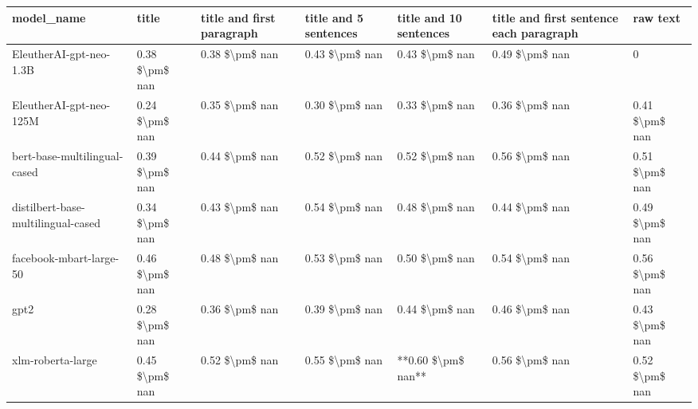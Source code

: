 \begin{tabular}{lllllll}
\toprule
                        model\_name &          title & title and first paragraph & title and 5 sentences & title and 10 sentences & title and first sentence each paragraph &       raw text \\
\midrule
           EleutherAI-gpt-neo-1.3B & 0.38 \$\textbackslash pm\$ nan &            0.38 \$\textbackslash pm\$ nan &        0.43 \$\textbackslash pm\$ nan &         0.43 \$\textbackslash pm\$ nan &                          0.49 \$\textbackslash pm\$ nan &              0 \\
           EleutherAI-gpt-neo-125M & 0.24 \$\textbackslash pm\$ nan &            0.35 \$\textbackslash pm\$ nan &        0.30 \$\textbackslash pm\$ nan &         0.33 \$\textbackslash pm\$ nan &                          0.36 \$\textbackslash pm\$ nan & 0.41 \$\textbackslash pm\$ nan \\
      bert-base-multilingual-cased & 0.39 \$\textbackslash pm\$ nan &            0.44 \$\textbackslash pm\$ nan &        0.52 \$\textbackslash pm\$ nan &         0.52 \$\textbackslash pm\$ nan &                          0.56 \$\textbackslash pm\$ nan & 0.51 \$\textbackslash pm\$ nan \\
distilbert-base-multilingual-cased & 0.34 \$\textbackslash pm\$ nan &            0.43 \$\textbackslash pm\$ nan &        0.54 \$\textbackslash pm\$ nan &         0.48 \$\textbackslash pm\$ nan &                          0.44 \$\textbackslash pm\$ nan & 0.49 \$\textbackslash pm\$ nan \\
           facebook-mbart-large-50 & 0.46 \$\textbackslash pm\$ nan &            0.48 \$\textbackslash pm\$ nan &        0.53 \$\textbackslash pm\$ nan &         0.50 \$\textbackslash pm\$ nan &                          0.54 \$\textbackslash pm\$ nan & 0.56 \$\textbackslash pm\$ nan \\
                              gpt2 & 0.28 \$\textbackslash pm\$ nan &            0.36 \$\textbackslash pm\$ nan &        0.39 \$\textbackslash pm\$ nan &         0.44 \$\textbackslash pm\$ nan &                          0.46 \$\textbackslash pm\$ nan & 0.43 \$\textbackslash pm\$ nan \\
                 xlm-roberta-large & 0.45 \$\textbackslash pm\$ nan &            0.52 \$\textbackslash pm\$ nan &        0.55 \$\textbackslash pm\$ nan &     **0.60 \$\textbackslash pm\$ nan** &                          0.56 \$\textbackslash pm\$ nan & 0.52 \$\textbackslash pm\$ nan \\
\bottomrule
\end{tabular}
